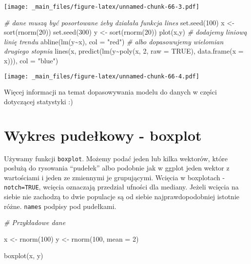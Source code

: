 \documentclass[
]{book}
\newenvironment{Shaded}{\begin{snugshade}}{\end{snugshade}}
\newcommand{\AttributeTok}[1]{\textcolor[rgb]{0.77,0.63,0.00}{#1}}
\newcommand{\CommentTok}[1]{\textcolor[rgb]{0.56,0.35,0.01}{\textit{#1}}}
\newcommand{\ConstantTok}[1]{\textcolor[rgb]{0.00,0.00,0.00}{#1}}
\newcommand{\DecValTok}[1]{\textcolor[rgb]{0.00,0.00,0.81}{#1}}
\newcommand{\FunctionTok}[1]{\textcolor[rgb]{0.00,0.00,0.00}{#1}}
\newcommand{\NormalTok}[1]{#1}
\newcommand{\OtherTok}[1]{\textcolor[rgb]{0.56,0.35,0.01}{#1}}
\newcommand{\SpecialCharTok}[1]{\textcolor[rgb]{0.00,0.00,0.00}{#1}}
\newcommand{\StringTok}[1]{\textcolor[rgb]{0.31,0.60,0.02}{#1}}
\begin{document}
\texttt{[image: \_main\_files/figure-latex/unnamed-chunk-66-3.pdf]}

\begin{Shaded}
\begin{Highlighting}[]
\CommentTok{\# dane muszą być posortowane żeby działała funkcja lines}
\FunctionTok{set.seed}\NormalTok{(}\DecValTok{100}\NormalTok{)}
\NormalTok{x }\OtherTok{\textless{}{-}} \FunctionTok{sort}\NormalTok{(}\FunctionTok{rnorm}\NormalTok{(}\DecValTok{20}\NormalTok{))}
\FunctionTok{set.seed}\NormalTok{(}\DecValTok{300}\NormalTok{)}
\NormalTok{y }\OtherTok{\textless{}{-}} \FunctionTok{sort}\NormalTok{(}\FunctionTok{rnorm}\NormalTok{(}\DecValTok{20}\NormalTok{))}
\FunctionTok{plot}\NormalTok{(x,y)}
\CommentTok{\# dodajemy liniową linię trendu}
\FunctionTok{abline}\NormalTok{(}\FunctionTok{lm}\NormalTok{(y}\SpecialCharTok{\textasciitilde{}}\NormalTok{x), }\AttributeTok{col =} \StringTok{"red"}\NormalTok{)}
\CommentTok{\# albo dopasowujemy wielomian drugiego stopnia}
\FunctionTok{lines}\NormalTok{(x, }\FunctionTok{predict}\NormalTok{(}\FunctionTok{lm}\NormalTok{(y}\SpecialCharTok{\textasciitilde{}}\FunctionTok{poly}\NormalTok{(x, }\DecValTok{2}\NormalTok{, }\AttributeTok{raw =} \ConstantTok{TRUE}\NormalTok{), }\FunctionTok{data.frame}\NormalTok{(}\AttributeTok{x =}\NormalTok{ x))), }\AttributeTok{col =} \StringTok{"blue"}\NormalTok{)}
\end{Highlighting}
\end{Shaded}

\texttt{[image: \_main\_files/figure-latex/unnamed-chunk-66-4.pdf]}

Więcej informacji na temat dopasowywania modelu do danych w części dotyczącej statystyki :)

\hypertarget{wykres-pudeux142kowy---boxplot-1}{%
\section{Wykres pudełkowy - boxplot}\label{wykres-pudeux142kowy---boxplot-1}}

Używamy funkcji \texttt{boxplot}. Możemy podać jeden lub kilka wektorów, które posłużą do rysowania ``pudełek'' albo podobnie jak w ggplot jeden wektor z wartościami i jeden ze zmiennymi je grupującymi. Wcięcia w boxplotach - \texttt{notch=TRUE}, wcięcia oznaczają przedział ufności dla mediany. Jeżeli wcięcia na siebie nie zachodzą to dwie populacje są od siebie najprawdopodobniej istotnie różne. \texttt{names} podpisy pod pudełkami.

\begin{Shaded}
\begin{Highlighting}[]
\CommentTok{\# Przykładowe dane}

\NormalTok{x }\OtherTok{\textless{}{-}} \FunctionTok{rnorm}\NormalTok{(}\DecValTok{100}\NormalTok{)}
\NormalTok{y }\OtherTok{\textless{}{-}} \FunctionTok{rnorm}\NormalTok{(}\DecValTok{100}\NormalTok{, }\AttributeTok{mean =} \DecValTok{2}\NormalTok{)}

\FunctionTok{boxplot}\NormalTok{(x, y)}
\end{Highlighting}
\end{Shaded}
\end{document}
